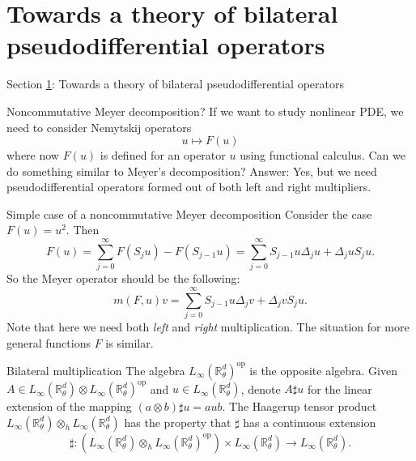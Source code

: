 \documentclass{beamer}
\numberwithin{equation}{section}
\theoremstyle{plain}
\theoremstyle{plain}
\theoremstyle{definition}
\theoremstyle{plain}
\theoremstyle{plain}
\theoremstyle{definition}
\newcommand{\Rl}{\mathbb{R}}
\newcommand{\dmult}{\sharp}
\newcommand{\op}{\mathrm{op}}
\begin{document}
\section{Towards a theory of bilateral pseudodifferential operators}\label{towards_section}

\begin{frame}
    \Huge{Section \ref{towards_section}: Towards a theory of bilateral pseudodifferential operators}
\end{frame}

\begin{frame}{Noncommutative Meyer decomposition?}
    If we want to study nonlinear PDE, we need to consider Nemytskij operators
    \[
        u\mapsto F(u)
    \]
    where now $F(u)$ is defined for an operator $u$ using functional calculus. Can we do something similar to Meyer's decomposition?
    \pause
    Answer: Yes, but we need pseudodifferential operators formed out of both left and right multipliers.
\end{frame}

\begin{frame}{Simple case of a noncommutative Meyer decomposition}
    Consider the case $F(u) = u^2.$ Then
    \[
        F(u) = \sum_{j=0}^\infty F(S_{j}u)-F(S_{j-1}u) = \sum_{j=0}^\infty S_{j-1}u \Delta_j u + \Delta_j u S_j u.
    \]
    So the Meyer operator should be the following:
    \[
        m(F,u)v = \sum_{j=0}^\infty S_{j-1}u\Delta_j v+\Delta_j v S_{j}u.
    \]
    Note that here we need both \emph{left} and \emph{right} multiplication. The situation for more general functions $F$ is similar.
\end{frame}

\begin{frame}{Bilateral multiplication}
The algebra $L_\infty(\Rl^d_\theta)^\op$ is the opposite algebra. Given $A \in L_\infty(\Rl^d_\theta)\otimes L_\infty(\Rl^d_\theta)^{\mathrm{op}}$
and $u \in L_\infty(\Rl^d_\theta)$, denote $A\dmult u$ for the linear extension of the mapping $(a\otimes b)\dmult u = aub$.
The Haagerup tensor product $L_\infty(\Rl^d_\theta)\otimes_h L_\infty(\Rl^d_\theta)$ has the property that $\dmult$ has a continuous extension
\[
    \dmult:(L_{\infty}(\Rl^d_\theta)\otimes_{h} L_{\infty}(\Rl^d_\theta)^{\op})\times L_{\infty}(\Rl^d_\theta)\to L_{\infty}(\Rl^d_\theta).
\]
\end{frame}
\end{document}

